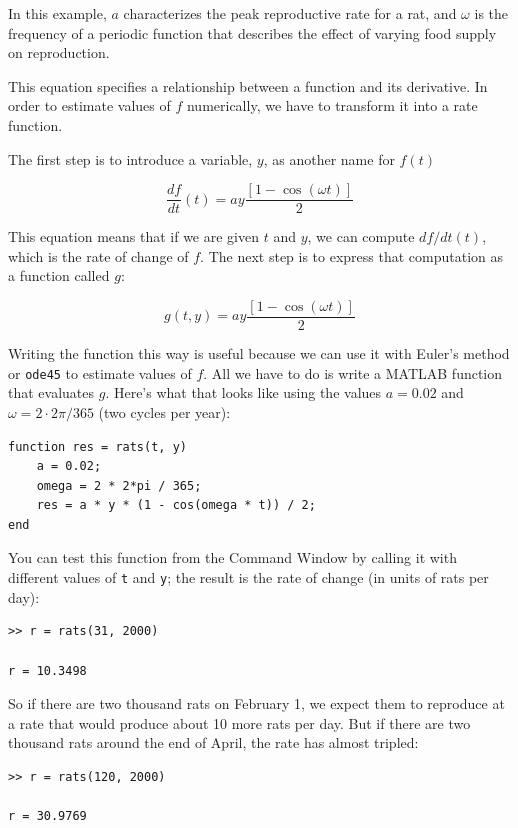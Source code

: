 \documentclass[
]{book}
\begin{document}
In this example, $a$ characterizes the peak reproductive rate for a rat, and
$\omega$ is the frequency of a periodic function that describes
the effect of varying food supply on reproduction.

This equation specifies a relationship between a
function and its derivative.  In order to estimate values of
$f$ numerically, we have to transform it into a rate function.

The first step is to introduce a variable,
$y$, as another name for $f(t)$

\begin{equation}
\frac{df}{dt}(t) = a y \frac{\left[1 - \cos (\omega t) \right]}{2}
\end{equation}

This equation means that if we are given $t$ and $y$, we can
compute $df/dt(t)$, which is the rate of change of $f$.
The next step is to express that computation as a function called
$g$:

\begin{equation}
g(t, y) = a y \frac{\left[1 - \cos (\omega t) \right]}{2}
\end{equation}

Writing the function this way is useful because we can use it
with Euler's method
or {\tt ode45} to estimate values of $f$.  All we have to
do is write a MATLAB function that evaluates $g$.  Here's what
that looks like using the values $a = 0.02$
and $\omega = 2 \cdot 2 \pi/365$ (two cycles per year):

\begin{verbatim}
function res = rats(t, y)
    a = 0.02;
    omega = 2 * 2*pi / 365;
    res = a * y * (1 - cos(omega * t)) / 2;
end
\end{verbatim}

You can test this function from the Command Window by calling it with
different values of {\tt t} and {\tt y}; the result is the rate of
change (in units of rats per day):

\begin{verbatim}
>> r = rats(31, 2000)

r = 10.3498
\end{verbatim}

So if there are two thousand rats on February 1, we expect them to 
reproduce at a rate that would produce about 10 more rats per day. 
But if there are two thousand rats around the end of April, the 
rate has almost tripled: 

\begin{verbatim}
>> r = rats(120, 2000)

r = 30.9769
\end{verbatim}
\end{document}
